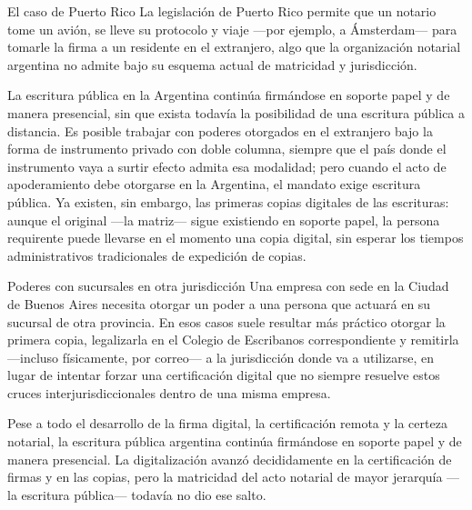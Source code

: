 \documentclass[12pt,oneside]{book}
\begin{document}
\begin{example}{El caso de Puerto Rico}
La legislación de Puerto Rico permite que un notario tome un avión, se lleve su protocolo y viaje ---por ejemplo, a Ámsterdam--- para tomarle la firma a un residente en el extranjero, algo que la organización notarial argentina no admite bajo su esquema actual de matricidad y jurisdicción.
\end{example}

La escritura pública en la Argentina continúa firmándose en soporte papel y de manera presencial, sin que exista todavía la posibilidad de una escritura pública a distancia. Es posible trabajar con poderes otorgados en el extranjero bajo la forma de instrumento privado con doble columna, siempre que el país donde el instrumento vaya a surtir efecto admita esa modalidad; pero cuando el acto de apoderamiento debe otorgarse en la Argentina, el mandato exige escritura pública. Ya existen, sin embargo, las primeras copias digitales de las escrituras: aunque el original ---la matriz--- sigue existiendo en soporte papel, la persona requirente puede llevarse en el momento una copia digital, sin esperar los tiempos administrativos tradicionales de expedición de copias.

\begin{example}{Poderes con sucursales en otra jurisdicción}
Una empresa con sede en la Ciudad de Buenos Aires necesita otorgar un poder a una persona que actuará en su sucursal de otra provincia. En esos casos suele resultar más práctico otorgar la primera copia, legalizarla en el Colegio de Escribanos correspondiente y remitirla ---incluso físicamente, por correo--- a la jurisdicción donde va a utilizarse, en lugar de intentar forzar una certificación digital que no siempre resuelve estos cruces interjurisdiccionales dentro de una misma empresa.
\end{example}

\begin{important}
Pese a todo el desarrollo de la firma digital, la certificación remota y la certeza notarial, la escritura pública argentina continúa firmándose en soporte papel y de manera presencial. La digitalización avanzó decididamente en la certificación de firmas y en las copias, pero la matricidad del acto notarial de mayor jerarquía ---la escritura pública--- todavía no dio ese salto.
\end{important}

\end{document}
